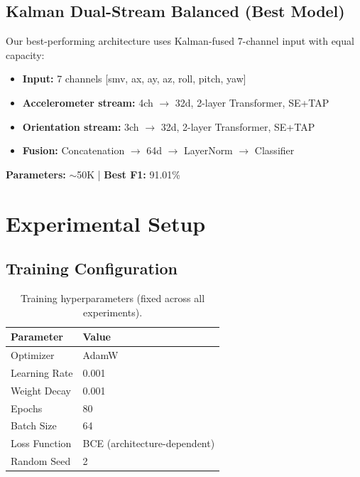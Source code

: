\documentclass{article}
\begin{document}
\subsection{Kalman Dual-Stream Balanced (Best Model)}

Our best-performing architecture uses Kalman-fused 7-channel input with equal capacity:

\begin{itemize}
    \item \textbf{Input:} 7 channels [smv, ax, ay, az, roll, pitch, yaw]
    \item \textbf{Accelerometer stream:} 4ch $\rightarrow$ 32d, 2-layer Transformer, SE+TAP
    \item \textbf{Orientation stream:} 3ch $\rightarrow$ 32d, 2-layer Transformer, SE+TAP
    \item \textbf{Fusion:} Concatenation $\rightarrow$ 64d $\rightarrow$ LayerNorm $\rightarrow$ Classifier
\end{itemize}

\textbf{Parameters:} $\sim$50K | \textbf{Best F1:} 91.01\%

\section{Experimental Setup}

\subsection{Training Configuration}

\begin{table}[htbp]
    \centering
    \caption{Training hyperparameters (fixed across all experiments).}
    \label{tab:training}
    \begin{tabular}{ll}
        \toprule
        \textbf{Parameter} & \textbf{Value} \\
        \midrule
        Optimizer & AdamW \\
        Learning Rate & 0.001 \\
        Weight Decay & 0.001 \\
        Epochs & 80 \\
        Batch Size & 64 \\
        Loss Function & BCE (architecture-dependent) \\
        Random Seed & 2 \\
        \bottomrule
    \end{tabular}
\end{table}
\end{document}
